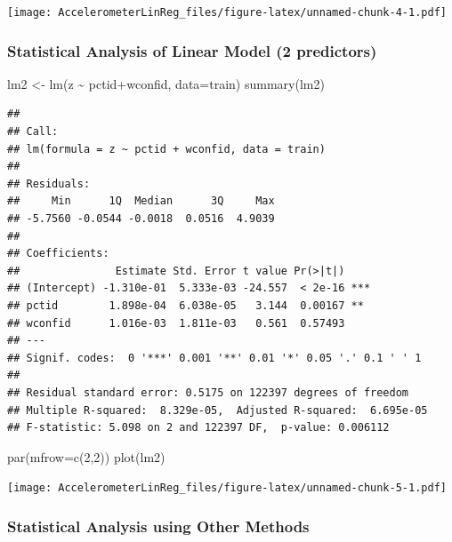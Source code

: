 \documentclass[
]{article}
\newenvironment{Shaded}{\begin{snugshade}}{\end{snugshade}}
\newcommand{\AttributeTok}[1]{\textcolor[rgb]{0.77,0.63,0.00}{#1}}
\newcommand{\DecValTok}[1]{\textcolor[rgb]{0.00,0.00,0.81}{#1}}
\newcommand{\FunctionTok}[1]{\textcolor[rgb]{0.00,0.00,0.00}{#1}}
\newcommand{\NormalTok}[1]{#1}
\newcommand{\OtherTok}[1]{\textcolor[rgb]{0.56,0.35,0.01}{#1}}
\newcommand{\SpecialCharTok}[1]{\textcolor[rgb]{0.00,0.00,0.00}{#1}}
\begin{document}
\texttt{[image: AccelerometerLinReg\_files/figure-latex/unnamed-chunk-4-1.pdf]}

\hypertarget{statistical-analysis-of-linear-model-2-predictors}{%
\subsubsection{Statistical Analysis of Linear Model (2
predictors)}\label{statistical-analysis-of-linear-model-2-predictors}}

\begin{Shaded}
\begin{Highlighting}[]
\NormalTok{lm2 }\OtherTok{\textless{}{-}} \FunctionTok{lm}\NormalTok{(z }\SpecialCharTok{\textasciitilde{}}\NormalTok{ pctid}\SpecialCharTok{+}\NormalTok{wconfid, }\AttributeTok{data=}\NormalTok{train)}
\FunctionTok{summary}\NormalTok{(lm2)}
\end{Highlighting}
\end{Shaded}

\begin{verbatim}
## 
## Call:
## lm(formula = z ~ pctid + wconfid, data = train)
## 
## Residuals:
##     Min      1Q  Median      3Q     Max 
## -5.7560 -0.0544 -0.0018  0.0516  4.9039 
## 
## Coefficients:
##               Estimate Std. Error t value Pr(>|t|)    
## (Intercept) -1.310e-01  5.333e-03 -24.557  < 2e-16 ***
## pctid        1.898e-04  6.038e-05   3.144  0.00167 ** 
## wconfid      1.016e-03  1.811e-03   0.561  0.57493    
## ---
## Signif. codes:  0 '***' 0.001 '**' 0.01 '*' 0.05 '.' 0.1 ' ' 1
## 
## Residual standard error: 0.5175 on 122397 degrees of freedom
## Multiple R-squared:  8.329e-05,  Adjusted R-squared:  6.695e-05 
## F-statistic: 5.098 on 2 and 122397 DF,  p-value: 0.006112
\end{verbatim}

\begin{Shaded}
\begin{Highlighting}[]
\FunctionTok{par}\NormalTok{(}\AttributeTok{mfrow=}\FunctionTok{c}\NormalTok{(}\DecValTok{2}\NormalTok{,}\DecValTok{2}\NormalTok{))}
\FunctionTok{plot}\NormalTok{(lm2)}
\end{Highlighting}
\end{Shaded}

\texttt{[image: AccelerometerLinReg\_files/figure-latex/unnamed-chunk-5-1.pdf]}

\hypertarget{statistical-analysis-using-other-methods}{%
\subsubsection{Statistical Analysis using Other
Methods}\label{statistical-analysis-using-other-methods}}
\end{document}
